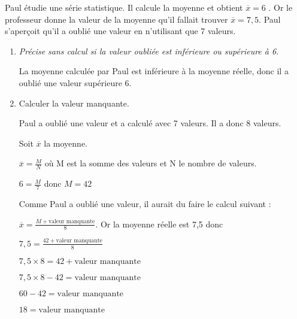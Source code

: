 
Paul étudie une série statistique. Il calcule la moyenne et obtient $\overline{x}=6$ .
Or le professeur donne la valeur de la moyenne qu'il fallait trouver $\overline{x}=7,5$.
Paul s'aperçoit qu'il a oublié une valeur en n'utilisant que 7 valeurs.
\begin{enumerate}
\item \textit{Précise sans calcul si la valeur oubliée est inférieure ou supérieure à 6.}

La moyenne calculée par Paul est inférieure à la moyenne réelle, donc il a oublié une valeur supérieure 6.

\item Calculer la valeur manquante.

Paul a oublié une valeur et a calculé avec 7 valeurs. Il a donc 8 valeurs.


Soit $\overline{x}$ la moyenne.

$\overline{x}= \frac{M}{N}$ où M est la somme des valeurs et N le nombre de valeurs.


$6= \frac{M}{7}$ donc $M=42$

Comme Paul a oublié une valeur, il aurait du faire le calcul suivant :

$\overline{x}= \frac{M+ \text{valeur manquante}}{8}$. Or la moyenne réelle est 7,5 donc

$7,5= \frac{42+ \text{valeur manquante}}{8}$

$7,5 \times 8= 42+ \text{valeur manquante}$

$7,5 \times 8-42 = \text{valeur manquante}$

$60-42 = \text{valeur manquante}$

$18 = \text{valeur manquante}$
\end{enumerate}